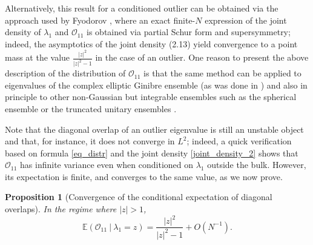 \documentclass[12pt,a4paper]{amsart}
\theoremstyle{plain} %
\newtheorem{proposition}[theorem]{Proposition}
\newcommand{\E}{\mathbb{E}}
\newcommand{\Ov}{\mathscr{O}}
\newcommand{\la}{\lambda}
\begin{document}
Alternatively, this result for a conditioned outlier can be obtained via the approach used by Fyodorov \cite{Fyodorov}, where an exact finite-$N$ expression of the joint density of $\la_1$ and $\Ov_{11}$ is obtained via partial Schur form and supersymmetry; indeed, the asymptotics of the joint density (2.13) yield convergence to a point mass at the value $\frac{|z|^2}{|z|^2-1}$ in the case of an outlier.
One reason to present the above description of the distribution of $\Ov_{11}$ is that the same method can be applied to eigenvalues of the complex elliptic Ginibre ensemble (as was done in \cite{Thomas2026}) and also in principle to other non-Gaussian but integrable ensembles such as the spherical ensemble or the truncated unitary ensembles \cite{DubachSpherical}.

Note that the diagonal overlap of an outlier eigenvalue is still an unstable object and that, for instance, it does not converge in $L^2$; indeed, a quick verification based on formula \eqref{eq_distr} and the joint density \eqref{joint_density_2} shows that $\Ov_{11}$ has infinite variance even when conditioned on $\la_1$ outside the bulk. However, its expectation is finite, and converges to the same value, as we now prove.

\begin{proposition}[Convergence of the conditional expectation of diagonal overlaps]\label{prop_cond_exp_conv}
In the regime where $|z|>1$,
    \begin{equation}
        \E \left( \Ov_{11} \ | \ \la_1 = z \right) = \frac{|z|^2}{|z|^2-1} + O(N^{-1}).
    \end{equation}
\end{proposition}
\end{document}
